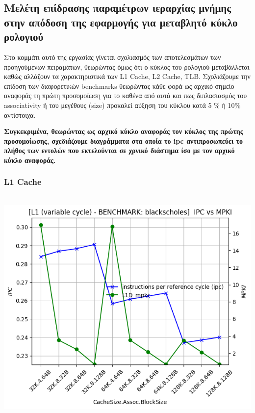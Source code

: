 \newpage \subsection{Μελέτη επίδρασης παραμέτρων ιεραρχίας μνήμης στην απόδοση της εφαρμογής για μεταβλητό κύκλο ρολογιού}
\vspace{3mm}


Στο κομμάτι αυτό της εργασίας γίνεται σχολιασμός των αποτελεσμάτων των
προηγούμενων πειραμάτων, θεωρώντας όμως ότι ο κύκλος του ρολογιού μεταβάλλεται
καθώς αλλάζουν τα χαρακτηριστικά των L1 Cache, L2 Cache, TLB. Σχολιάζουμε την
επίδοση των διαφορετικών benchmarks θεωρώντας κάθε φορά ως αρχικό σημείο
αναφοράς τη πρώτη προσομοίωση για το καθένα από αυτά και πως διπλασιασμός του
associativity ή του μεγέθους (size) προκαλεί αύξηση του κύκλου κατά 5 \% ή 10\%
αντίστοιχα. 

\textbf{Συγκεκριμένα, θεωρώντας ως αρχικό κύκλο αναφοράς τον κύκλος της
πρώτης προσομοίωσης, σχεδιάζουμε διαγράμματα στα οποία \color{red} το ipc αντιπροσωπεύει το
πλήθος των εντολών που εκτελούνται σε χρνικό διάστημα ίσο με τον αρχικό κύκλο
αναφοράς.}


\subsubsection{L1 Cache}
\begin{minipage}{\textwidth}
    \begin{center}
        \\
        \vspace{3mm}
        \includegraphics[scale=0.65]{graphs/L1/var/blackscholes.png}
        \vspace{6mm}
    \end{center}
\end{minipage}


